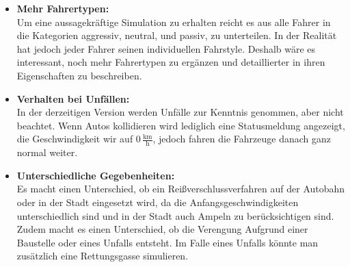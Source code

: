 \begin{itemize}
	\item \textbf{Mehr Fahrertypen:}\\
	Um eine aussagekräftige Simulation zu erhalten reicht es aus alle Fahrer in die Kategorien aggressiv, neutral, und passiv, zu unterteilen. In der Realität hat jedoch jeder Fahrer seinen individuellen Fahrstyle. Deshalb wäre es interessant, noch mehr Fahrertypen zu ergänzen und detaillierter in ihren Eigenschaften zu beschreiben.
	
	\item \textbf{Verhalten bei Unfällen:}\\
	In der derzeitigen Version werden Unfälle zur Kenntnis genommen, aber nicht beachtet. Wenn Autos kollidieren wird lediglich eine Statusmeldung angezeigt, die Geschwindigkeit wir auf 0\,$ \frac{\text{km}}{\text{h}} $, jedoch fahren die Fahrzeuge danach ganz normal weiter.
	
	\item \textbf{Unterschiedliche Gegebenheiten:}\\
	Es macht einen Unterschied, ob ein Reißverschlussverfahren auf der Autobahn oder in der Stadt eingesetzt wird, da die Anfangsgeschwindigkeiten unterschiedlich sind und in der Stadt auch Ampeln zu berücksichtigen sind.\\
	Zudem macht es einen Unterschied, ob die Verengung Aufgrund einer Baustelle oder eines Unfalls entsteht. Im Falle eines Unfalls könnte man zusätzlich eine Rettungsgasse simulieren.
\end{itemize}